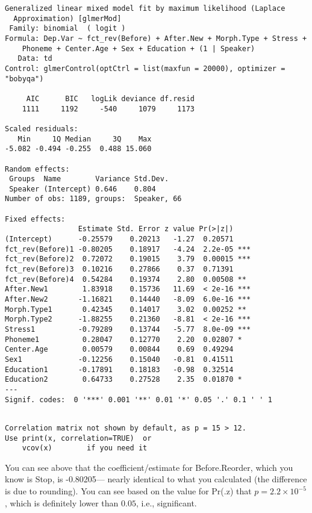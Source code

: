 \documentclass[
  10pt,
  letterpaper]{article}
\renewcommand\texttt[1]{{\ttfamily\color{BrickRed}#1}}
\begin{document}
\begin{verbatim}
Generalized linear mixed model fit by maximum likelihood (Laplace
  Approximation) [glmerMod]
 Family: binomial  ( logit )
Formula: Dep.Var ~ fct_rev(Before) + After.New + Morph.Type + Stress +  
    Phoneme + Center.Age + Sex + Education + (1 | Speaker)
   Data: td
Control: glmerControl(optCtrl = list(maxfun = 20000), optimizer = "bobyqa")

     AIC      BIC   logLik deviance df.resid 
    1111     1192     -540     1079     1173 

Scaled residuals: 
   Min     1Q Median     3Q    Max 
-5.082 -0.494 -0.255  0.488 15.060 

Random effects:
 Groups  Name        Variance Std.Dev.
 Speaker (Intercept) 0.646    0.804   
Number of obs: 1189, groups:  Speaker, 66

Fixed effects:
                 Estimate Std. Error z value Pr(>|z|)    
(Intercept)      -0.25579    0.20213   -1.27  0.20571    
fct_rev(Before)1 -0.80205    0.18917   -4.24  2.2e-05 ***
fct_rev(Before)2  0.72072    0.19015    3.79  0.00015 ***
fct_rev(Before)3  0.10216    0.27866    0.37  0.71391    
fct_rev(Before)4  0.54284    0.19374    2.80  0.00508 ** 
After.New1        1.83918    0.15736   11.69  < 2e-16 ***
After.New2       -1.16821    0.14440   -8.09  6.0e-16 ***
Morph.Type1       0.42345    0.14017    3.02  0.00252 ** 
Morph.Type2      -1.88255    0.21360   -8.81  < 2e-16 ***
Stress1          -0.79289    0.13744   -5.77  8.0e-09 ***
Phoneme1          0.28047    0.12770    2.20  0.02807 *  
Center.Age        0.00579    0.00844    0.69  0.49294    
Sex1             -0.12256    0.15040   -0.81  0.41511    
Education1       -0.17891    0.18183   -0.98  0.32514    
Education2        0.64733    0.27528    2.35  0.01870 *  
---
Signif. codes:  0 '***' 0.001 '**' 0.01 '*' 0.05 '.' 0.1 ' ' 1
\end{verbatim}

\begin{verbatim}

Correlation matrix not shown by default, as p = 15 > 12.
Use print(x, correlation=TRUE)  or
    vcov(x)        if you need it
\end{verbatim}

You can see above that the coefficient/estimate for
\texttt{Before.Reorder}, which you know is \texttt{Stop}, is
\texttt{-0.80205}--- nearly identical to what you calculated (the
difference is due to rounding). You can see based on the value for
\texttt{Pr(.\textbar{}z\textbar{})} that \(p=2.2\times 10^{-5}\), which
is definitely lower than \(0.05\), i.e., significant.
\end{document}
